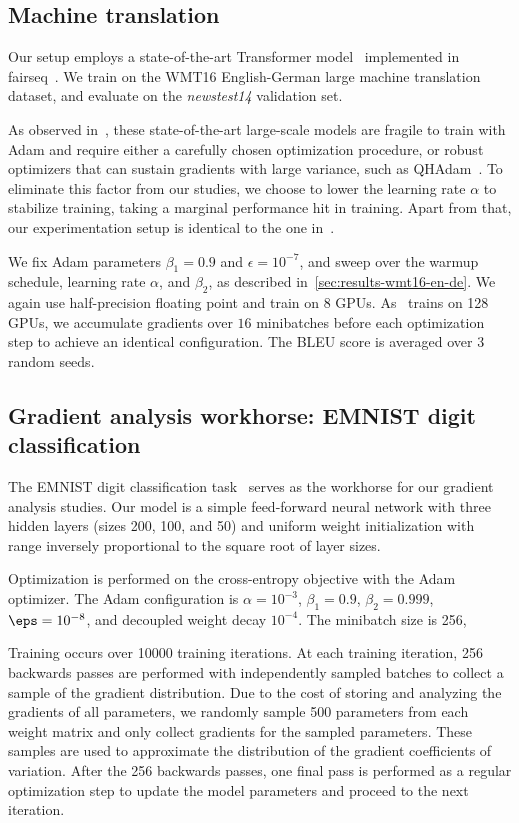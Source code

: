 {\subsection{Machine translation}
\label{apx:training-details-wmt16-en-de}

Our setup employs a state-of-the-art Transformer model~\citep{vasmani2017transformer} implemented in fairseq~\citep{ott2019fairseq}. We train on the WMT16 English-German large machine translation dataset, and evaluate on the \textit{newstest14} validation set.

As observed in~\cite{ma2019qh}, these state-of-the-art large-scale models are fragile to train with Adam and require either a carefully chosen optimization procedure, or robust optimizers that can sustain gradients with large variance, such as QHAdam~\citep{ma2019qh}. To eliminate this factor from our studies, we choose to lower the learning rate $\alpha$ to stabilize training, taking a marginal performance hit in training. Apart from that, our experimentation setup is identical to the one in~\cite{ott2019fairseq}.

We fix Adam parameters $\beta_1=0.9$ and $\epsilon=10^{-7}$, and sweep over the warmup schedule, learning rate $\alpha$, and $\beta_2$, as described in~\cref*{sec:results-wmt16-en-de}. We again use half-precision floating point and train on 8 GPUs. As~\cite{ott2019fairseq} trains on 128 GPUs, we accumulate gradients over $16$ minibatches before each optimization step to achieve an identical configuration. The BLEU score is averaged over $3$ random seeds.

\subsection{Gradient analysis workhorse: EMNIST digit classification}
\label{apx:training-details-emnist}

The EMNIST digit classification task~\citep{cohen2017emnist} serves as the workhorse for our gradient analysis studies. Our model is a simple feed-forward neural network with three hidden layers (sizes 200, 100, and 50) and uniform weight initialization with range inversely proportional to the square root of layer sizes.

Optimization is performed on the cross-entropy objective with the Adam optimizer. The Adam configuration is $\alpha = 10^{-3}$, $\beta_1 = 0.9$, $\beta_2 = 0.999$, $\eps = 10^{-8}$, and decoupled weight decay $10^{-4}$. The minibatch size is 256,

Training occurs over 10000 training iterations. At each training iteration, 256 backwards passes are performed with independently sampled batches to collect a sample of the gradient distribution. Due to the cost of storing and analyzing the gradients of all parameters, we randomly sample 500 parameters from each weight matrix and only collect gradients for the sampled parameters. These samples are used to approximate the distribution of the gradient coefficients of variation. After the 256 backwards passes, one final pass is performed as a regular optimization step to update the model parameters and proceed to the next iteration.  \newpage
}
